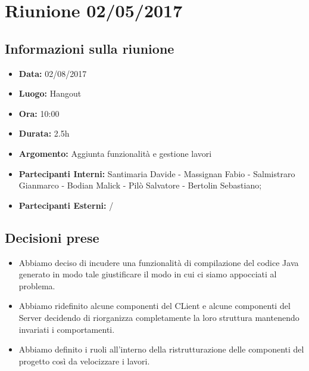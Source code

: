 \section{Riunione 02/05/2017}
  \subsection{Informazioni sulla riunione}
    \begin{itemize}
      \item \textbf{Data: }02/08/2017
      \item \textbf{Luogo: }Hangout
      \item \textbf{Ora: }10:00
      \item \textbf{Durata: }2.5h
      \item \textbf{Argomento: }Aggiunta funzionalità e gestione lavori
      \item \textbf{Partecipanti Interni: }Santimaria Davide - Massignan Fabio - Salmistraro Gianmarco - Bodian Malick - Pilò Salvatore - Bertolin Sebastiano;
      \item \textbf{Partecipanti Esterni: }/
    \end{itemize}
  \subsection{Decisioni prese}
		\begin{itemize}
			\item Abbiamo deciso di incudere una funzionalità di compilazione del codice Java generato in modo tale giustificare il modo in cui ci siamo appocciati al problema.
      \item Abbiamo ridefinito alcune componenti del CLient e alcune componenti del Server decidendo di riorganizza completamente la loro struttura mantenendo invariati i comportamenti.
      \item Abbiamo definito i ruoli all'interno della ristrutturazione delle componenti del progetto così da velocizzare i lavori.
		\end{itemize}
